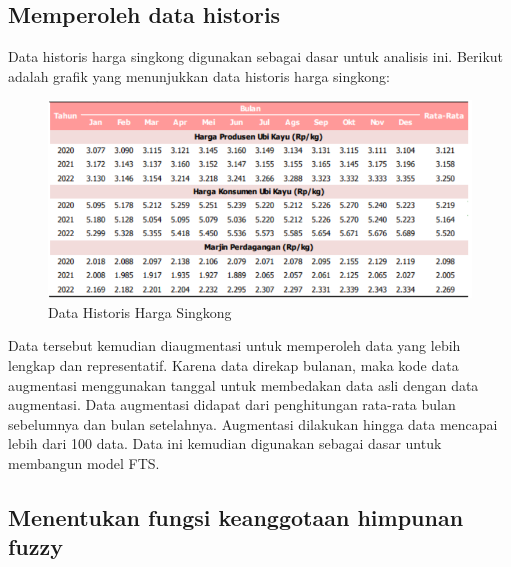 \documentclass[conference]{IEEEtran}
\begin{document}
\subsection{Memperoleh data historis}
Data historis harga singkong digunakan sebagai dasar untuk analisis ini. Berikut adalah grafik yang menunjukkan data historis harga singkong:
\begin{figure}[H]
    \centering
    \includegraphics[width=\columnwidth]{images/Data Historis.png} 
    \caption{Data Historis Harga Singkong}
\end{figure}
Data tersebut kemudian diaugmentasi untuk memperoleh data yang lebih lengkap dan representatif. Karena data direkap bulanan, maka kode data augmentasi menggunakan tanggal untuk membedakan data asli dengan data augmentasi. Data augmentasi didapat dari penghitungan rata-rata bulan sebelumnya dan bulan setelahnya. Augmentasi dilakukan hingga data mencapai lebih dari 100 data. Data ini kemudian digunakan sebagai dasar untuk membangun model FTS.

\subsection{Menentukan fungsi keanggotaan himpunan fuzzy}
\end{document}
